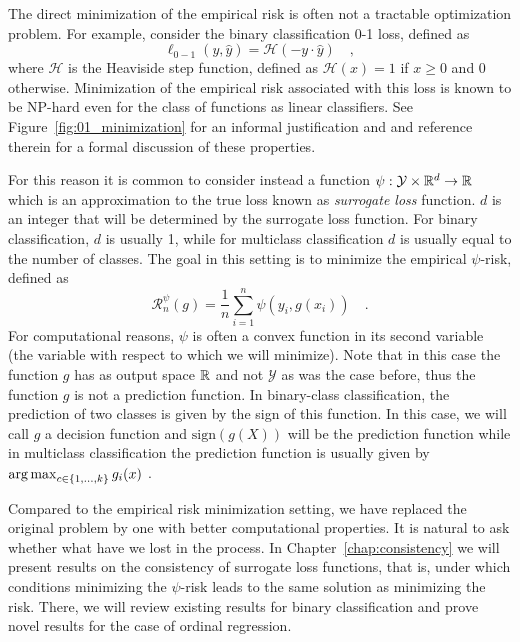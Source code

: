 

The direct minimization of the empirical risk is often not a tractable optimization problem. For example, consider the binary classification 0-1 loss, defined as
$$
\ell_{0-1}(y, \hat{y}) = \mathcal{H}( - y \cdot \hat{y}) \quad,
$$
where $\mathcal{H}$ is the \gls{Heaviside} step function, defined as $\mathcal{H}(x) = 1$ if $x \geq 0$ and $0$ otherwise.
Minimization of the empirical risk associated with this loss is known to be NP-hard even for the class of functions as linear classifiers. See Figure~\ref{fig:01_minimization} for an informal justification and \citep{feldman2012agnostic} and reference therein for a formal discussion of these properties. 

For this reason it is common to consider instead a function ${\psi: \mathcal{Y} \times {\mathbb R}^d \to {\mathbb R}}$ which is an approximation to the true loss known as \emph{surrogate loss} function. $d$ is an integer that will be determined by the surrogate loss function. For binary classification, $d$ is usually 1, while for multiclass classification $d$ is usually equal to the number of classes. The goal in this setting is to minimize the empirical $\psi$-risk, defined as
$$
{\mathcal{R}}_{n}^{\psi}(g) = \frac{1}{n} \sum_{i=1}^n \psi(y_i, g(x_i)) \quad.
$$
For computational reasons, $\psi$ is often a convex function in its second variable (the variable with respect to which we will minimize). Note that in this case the function $g$ has as output space ${\mathbb R}$ and not $\mathcal{Y}$ as was the case before, thus the function $g$ is not a prediction function. In binary-class classification, the prediction of two classes is given by the sign of this function. In this case, we will call $g$ a decision function and $\text{sign}(g(X))$ will be the prediction function while in multiclass classification the prediction function is usually given by $\operatorname*{arg\,max}_{c \in \{1, \ldots, k\}} g_i(x)$ \citep{Zhang2004}.


Compared to the empirical risk minimization setting, we have replaced the original problem by one with better computational properties. It is natural to ask whether what have we lost in the process. In Chapter~\ref{chap:consistency} we will present results on the consistency of surrogate loss functions, that is, under which conditions minimizing the $\psi$-risk leads to the same solution as minimizing the risk. There, we will review existing results for binary classification and prove novel results for the case of ordinal regression.



